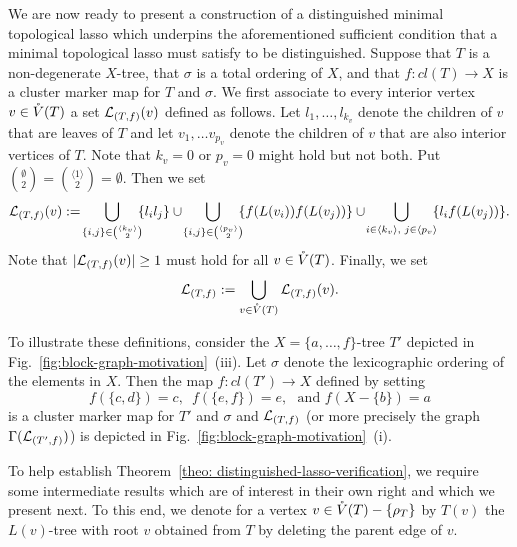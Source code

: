 We are now ready to present a construction of a distinguished minimal
topological lasso which underpins the aforementioned sufficient condition that
a minimal topological lasso must satisfy to be distinguished.  Suppose that
$T$ is a non-degenerate $X$-tree, that $\sigma$ is a total ordering of $X$,
and that $f:cl(T)\to X$ is a cluster marker map for $T$ and $\sigma$. We first
associate to every interior vertex $v\in \mathring{V}(T)$ a set ${\mathcal L}_{(T,f)} (v)$
defined as follows. Let $l_1,\ldots, l_{k_v}$ denote the children of $v$ that
are leaves of $T$ and let $v_1,\ldots v_{p_v}$ denote the children of $v$ that
are also interior vertices of $T$. Note that $k_v=0$ or $p_v=0$ might hold but
not both. Put ${\emptyset \choose 2}={\langle 1\rangle \choose
  2}=\emptyset$. Then we set
$$
\cL_{(T,f)}(v):=\!\bigcup_{\{i,j\}\in {\langle k_v\rangle\choose 2}}\!\!\{l_il_j\}
\cup
\!\bigcup_{\{i,j\}\in {\langle p_v\rangle\choose 2}}\!\!\{f(L(v_i))f(L(v_j))\}
\cup
\!\bigcup_{i\in \langle k_v\rangle,\,\,j\in \langle p_v\rangle}
\!\!\{l_if(L(v_j))\}.
$$
Note that $|{\mathcal L}_{(T,f)}(v)|\geq 1$ must hold for all $v\in \mathring{V}(T)$. Finally,
we set
$$
{\mathcal L}_{(T,f)}:=\bigcup_{v\in \mathring{V}(T)} {\mathcal L}_{(T,f)}(v).
$$

To illustrate these definitions, consider the $X=\{a,\ldots, f\}$-tree $T'$
depicted in Fig.~\ref{fig:block-graph-motivation}~(iii).  Let $\sigma$ denote
the lexicographic ordering of the elements in $X$. Then the map $f:cl(T')\to
X$ defined by setting
$$
f(\{c,d\})=c, \,\,\,
f(\{e,f\})=e,\,\,\mbox{ and } f(X-\{b\})=a
$$
is a cluster marker map for $T'$ and $\sigma$ and 
${\mathcal L}_{(T,f)}$
(or more precisely the graph $\Gamma({\mathcal L}_{(T',f)})$) is depicted in
Fig.~\ref{fig:block-graph-motivation}~(i).

To help establish Theorem~\ref{theo: distinguished-lasso-verification}, we
require some intermediate results which are of interest in their own right and
which we present next. To this end, we denote for a vertex $v\in
\mathring{V}(T)-\{\rho_T\}$ by $T(v)$ the $L(v)$-tree with root $v$ obtained from $T$
by deleting the parent edge of $v$.

